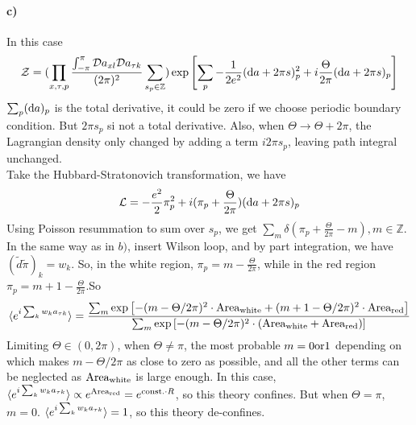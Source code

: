 \documentclass[a4paper,11pt]{article}
\begin{document}
\paragraph{c)}
In this case
\begin{equation}
    \mathcal{Z} = (\prod_{x,\tau, p} \frac{\int_{-\pi}^{\pi} {\mathcal{D}} a_{xl} {\mathcal{D}}  a_{\tau k}}{(2\pi)^2} \sum_{s_p \in \mathbb{Z}})
    \exp \left[\sum_{p} - \frac{1}{2e^2 }
    ({\rm d}a + 2\pi s)_p^2
    + i\frac{\Theta}{2\pi} ({\rm d}a + 2\pi s)_p
    \right]
\end{equation}
$\sum_p ({\rm d}a)_p $ is the total derivative, it could be zero if we choose periodic boundary condition. But $2\pi s_p$ si not a total derivative. Also, when $\Theta \rightarrow \Theta + 2\pi$, the Lagrangian density only changed by adding a term $i 2 \pi s_p$, leaving path integral unchanged.\\
Take the Hubbard-Stratonovich transformation, we have
\begin{equation}
    \mathcal{L} = 
    -\frac{e^2}{2} \pi_p^2 
    + i(\pi_p + \frac{\Theta}{2\pi} )({\rm d}a + 2\pi s)_p
\end{equation}
Using Poisson resummation to sum over $s_p$, we get $\sum_m \delta(\pi_p + \frac{\Theta}{2\pi} - m), m \in \mathbb{Z}$.
In the same way as in $b)$, insert Wilson loop, and by part integration, we have $(\tilde{d} \tilde{\pi})_k = w_k$. So, in the white region, $\pi_p = m - \frac{\Theta}{2\pi}$, while in the red region $\pi_p = m+1 - \frac{\Theta}{2\pi}$.So 
\begin{equation}
    \braket{e^{i\sum_k w_k a_{\tau k}}} 
    = \frac{\sum_m \exp \left[
        - (m - \Theta/2\pi)^2 \cdot {\rm Area_{white}} + (m +1 - \Theta/2\pi)^2 \cdot {\rm Area_{red}}
    \right]}{\sum_m \exp \left[
            - (m - \Theta/2\pi)^2 \cdot ({\rm Area_{white} + \rm Area_{red}})
        \right]}
\end{equation}
Limiting $\Theta \in (0, 2\pi)$, when $\Theta \neq \pi$, the most probable $m = 0 {\rm or} 1$ depending on which makes $m - \Theta /2\pi$ as close to zero as possible, and all the other terms can be neglected as $\rm Area_{white}$ is large enough. In this case, $\braket{e^{i\sum_k w_k a_{\tau k}}}  \propto e^{\rm Area_{red}} = e^{{\rm const.}\cdot R}$, so this theory confines. But when $\Theta = \pi$, $m = 0$. $\braket{e^{i\sum_k w_k a_{\tau k}}} =1$, so this theory de-confines.
\end{document}
